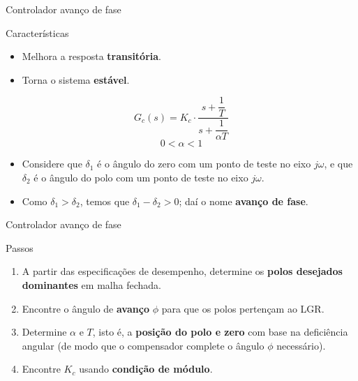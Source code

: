 \begin{frame}{Controlador avanço de fase}
\begin{block}{Características}
\begin{itemize}
	\item Melhora a resposta \textbf{transitória}.
	\item Torna o sistema \textbf{estável}.
\end{itemize}

\vspace{0.5cm}

\begin{minipage}{0.45\linewidth}
\centering

\scalebox{1}{}
\end{minipage}
\hfill
\begin{minipage}{0.45\linewidth}
\[ G_c(s)=K_c\cdot\dfrac{s+\dfrac{1}{T}}{s+\dfrac{1}{\alpha T}} \]
$$0 < \alpha < 1$$
\end{minipage}
\vspace{0.5cm}
\begin{itemize}
	\item Considere que $\delta_1$ é o ângulo do zero com um ponto de teste no eixo $j\omega$, e que $\delta_2$ é o ângulo do polo com um ponto de teste no eixo $j\omega$.
	\item Como $\delta_1 > \delta_2$, temos que $\delta_1 - \delta_2 > 0$; daí o nome \textbf{avanço de fase}.
\end{itemize}
\end{block}
\end{frame}


\begin{frame}{Controlador avanço de fase}
\begin{block}{Passos}
\begin{enumerate}
\item A partir das especificações de desempenho, determine os \textbf{polos desejados dominantes} em malha fechada.
\item Encontre o ângulo de \textbf{avanço} $ \phi $ para que os polos pertençam ao LGR.
\item Determine $ \alpha $ e $ T $, isto é, a \textbf{posição do polo e zero} com base na deficiência angular (de modo que o compensador complete o ângulo $ \phi $ necessário).
\item Encontre $ K_c $ usando \textbf{condição de módulo}.
\end{enumerate}
\end{block}
\end{frame}


